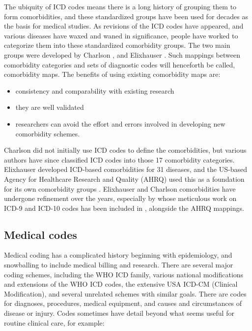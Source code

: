 \documentclass[article]{jss}
\providecommand{\tightlist}{%
  \setlength{\itemsep}{0pt}\setlength{\parskip}{0pt}}
\begin{document}
The ubiquity of ICD codes means there is a long history of grouping them
to form comorbidities, and these standardized groups have been used for
decades as the basis for medical studies. As revisions of the ICD codes
have appeared, and various diseases have waxed and waned in
significance, people have worked to categorize them into these
standardized comorbidity groups. The two main groups were developed by
Charlson \citep{charlson_new_1987}, and Elixhauser
\citep{elixhauser_comorbidity_1998}. Such mappings between comorbidity
categories and sets of diagnostic codes will henceforth be called,
comorbidity maps. The benefits of using existing comorbidity maps are:

\begin{itemize}
\tightlist
\item
  consistency and comparability with existing research
\item
  they are well validated
\item
  researchers can avoid the effort and errors involved in developing new
  comorbidity schemes.
\end{itemize}

Charlson did not initially use ICD codes to define the comorbidities,
but various authors \citep[e.g.,][]{quan_coding_2005} have since
classified ICD codes into those 17 comorbidity categories. Elixhauser
\citeyearpar{elixhauser_comorbidity_1998} developed ICD-based
comorbidities for 31 diseases, and the US-based Agency for Healthcare
Research and Quality (AHRQ) used this as a foundation for its own
comorbidity groups
\citep{AgencyforHealthcareResearchandQuality_Elixhausercomorbiditysoftware_2018}.
Elixhauser and Charlson comorbidities have undergone refinement over the
years, especially by \citet{quan_updating_2011} whose meticulous work on
ICD-9 and ICD-10 codes has been included in , alongside the
AHRQ mappings.

\hypertarget{medical-codes}{%
\subsection{Medical codes}\label{medical-codes}}

Medical coding has a complicated history beginning with epidemiology,
and snowballing to include medical billing and research. There are
several major coding schemes, including the WHO ICD family, various
national modifications and extensions of the WHO ICD codes, the
extensive USA ICD-CM (Clinical Modification), and several unrelated
schemes with similar goals. There are codes for diagnoses, procedures,
medical equipment, and causes and circumstances of disease or injury.
Codes sometimes have detail beyond what seems useful for routine
clinical care, for example:
\end{document}
